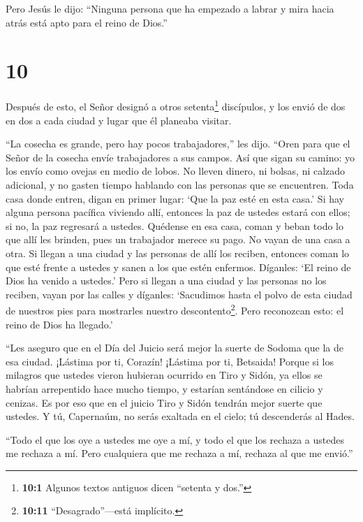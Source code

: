  Pero Jesús le dijo: ``Ninguna persona que ha empezado a
labrar y mira hacia atrás está apto para el reino de Dios.''

\hypertarget{section-9}{%
\section{10}\label{section-9}}

 Después de esto, el Señor designó a otros
setenta\footnote{\textbf{10:1} Algunos textos antiguos dicen ``setenta y
  dos.''} discípulos, y los envió de dos en dos a cada ciudad y lugar
que él planeaba visitar.

 ``La cosecha es grande, pero hay pocos trabajadores,'' les
dijo. ``Oren para que el Señor de la cosecha envíe trabajadores a sus
campos.  Así que sigan su camino: yo los envío como ovejas
en medio de lobos.  No lleven dinero, ni bolsas, ni calzado
adicional, y no gasten tiempo hablando con las personas que se
encuentren.  Toda casa donde entren, digan en primer lugar:
`Que la paz esté en esta casa.'  Si hay alguna persona
pacífica viviendo allí, entonces la paz de ustedes estará con ellos; si
no, la paz regresará a ustedes.  Quédense en esa casa, coman
y beban todo lo que allí les brinden, pues un trabajador merece su pago.
No vayan de una casa a otra.  Si llegan a una ciudad y las
personas de allí los reciben, entonces coman lo que esté frente a
ustedes  y sanen a los que estén enfermos. Díganles: `El
reino de Dios ha venido a ustedes.'  Pero si llegan a una
ciudad y las personas no los reciben, vayan por las calles y díganles:
 `Sacudimos hasta el polvo de esta ciudad de nuestros pies
para mostrarles nuestro descontento\footnote{\textbf{10:11}
  ``Desagrado''---está implícito.}. Pero reconozcan esto: el reino de
Dios ha llegado.'

 ``Les aseguro que en el Día del Juicio será mejor la
suerte de Sodoma que la de esa ciudad.  ¡Lástima por ti,
Corazín! ¡Lástima por ti, Betsaida! Porque si los milagros que ustedes
vieron hubieran ocurrido en Tiro y Sidón, ya ellos se habrían
arrepentido hace mucho tiempo, y estarían sentándose en cilicio y
cenizas.  Es por eso que en el juicio Tiro y Sidón tendrán
mejor suerte que ustedes.  Y tú, Capernaúm, no serás
exaltada en el cielo; tú descenderás al Hades.

 ``Todo el que los oye a ustedes me oye a mí, y todo el que
los rechaza a ustedes me rechaza a mí. Pero cualquiera que me rechaza a
mí, rechaza al que me envió.''

